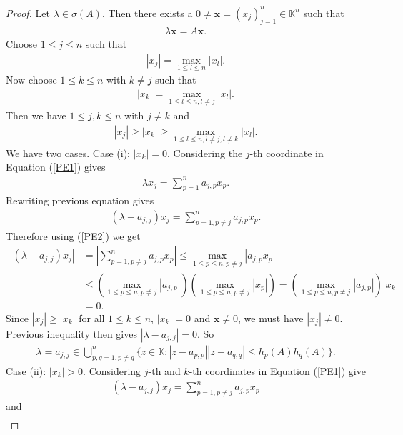 \documentclass[10pt,a4paper]{amsart}
\begin{document}
\begin{proof}
Let $\lambda \in \sigma(A)$. Then there exists a $0\neq \textbf{x} =(x_j)_{j=1}^n \in \mathbb{K}^n$ such that 
\begin{align}\label{PE1}
	\lambda \textbf{x} =A\textbf{x}.
\end{align}
Choose $1\leq j \leq n$ such that 
\begin{align*}
	 |x_j|=\max_{1\leq l \leq n}|x_l|.
\end{align*}
Now choose $1\leq k \leq n$ with $k \neq j$ such that 
\begin{align*}
	|x_k|=\max_{1\leq l \leq n, l\neq j}|x_l|.
\end{align*}
Then we have $1\leq j, k \leq n$ with $j \neq k$ and 
\begin{align}\label{PE2}
	|x_j|\geq |x_k|\geq \max_{1\leq l \leq n, l\neq j, l \neq k}|x_l|.
\end{align}
We have two cases. Case (i): $ |x_k|=0$. Considering the $j$-th coordinate in Equation (\ref{PE1}) gives 
\begin{align*}
	\lambda x_j=\sum_{p=1}^na_{j,p}x_p.
\end{align*}
Rewriting previous equation gives 
\begin{align*}
	(\lambda -a_{j,j})x_j=\sum_{p=1, p\neq j}^na_{j,p}x_p.
\end{align*}
Therefore using (\ref{PE2}) we get
\begin{align*}
	|(\lambda -a_{j,j})x_j|&=\left|\sum_{p=1, p\neq j}^na_{j,p}x_p\right|\leq \max_{1\leq p \leq n, p \neq j}|a_{j,p}x_p|\\
	&\leq \left(\max_{1\leq p \leq n, p \neq j}|a_{j,p}|\right)\left(\max_{1\leq p \leq n, p \neq j}|x_p|\right)=\left(\max_{1\leq p \leq n, p \neq j}|a_{j,p}|\right)|x_k|\\
	&=0.
\end{align*}
Since $	|x_j|\geq |x_k|$ for all $1\leq k \leq n$,  $ |x_k|=0$ and $\textbf{x}\neq 0$, we must have $|x_j|\neq 0$. Previous inequality then gives $	|\lambda -a_{j,j}|=0$. So 
\begin{align*}
\lambda =a_{j,j} \in \bigcup_{p, q=1, p \neq q}^n\{z \in \mathbb{K}: |z-a_{p,p}||z-a_{q,q}|\leq h_p(A)h_q(A)\}.
\end{align*}
Case (ii): $ |x_k|>0$. Considering $j$-th and $k$-th coordinates in Equation (\ref{PE1}) give
\begin{align}\label{PE3}
	(\lambda -a_{j,j})x_j=\sum_{p=1, p\neq j}^na_{j,p}x_p
\end{align}
and 
\begin{align}\label{PE4}

\end{align}
\end{proof}
\end{document}

